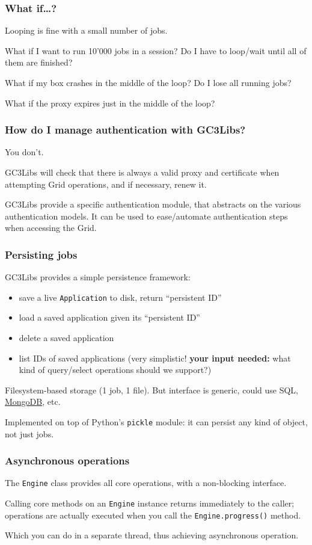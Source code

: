 \documentclass[presentation]{beamer}
\begin{document}
\begin{frame}
\frametitle{What if\ldots{}?}
\label{sec-16}

  Looping is fine with a small number of jobs.

  What if I want to run 10'000 jobs in a session? Do I have to
  loop/wait until all of them are finished?

  What if my box crashes in the middle of the loop?  Do I lose all
  running jobs? 

  What if the proxy expires just in the middle of the loop?
\end{frame}
\begin{frame}
\frametitle{How do I manage authentication with GC3Libs?}
\label{sec-17}

  You don't.

  GC3Libs will check that there is always a valid proxy and
  certificate when attempting Grid operations, and if necessary, renew
  it.  

  GC3Libs provide a specific authentication module, that abstracts on
  the various authentication models.  It can be used to ease/automate
  authentication steps when accessing the Grid.
\end{frame}
\begin{frame}
\frametitle{Persisting jobs}
\label{sec-18}

  GC3Libs provides a simple persistence framework: 
\begin{itemize}
\item save a live \texttt{Application} to disk, return ``persistent ID''
\item load a saved application given its ``persistent ID''
\item delete a saved application
\item list IDs of saved applications (very simplistic! \textbf{your input     needed:} what kind of query/select operations should we support?)
\end{itemize}

  Filesystem-based storage (1 job, 1 file).  But interface is generic,
  could use SQL, \href{http://www.mongodb.org}{MongoDB}, etc.

  Implemented on top of Python's \texttt{pickle} module: it can persist any
  kind of object, not just jobs.
\end{frame}
\begin{frame}
\frametitle{Asynchronous operations}
\label{sec-19}

  The \texttt{Engine} class provides all core operations, 
  with a non-blocking interface.

  Calling core methods on an \texttt{Engine} instance returns immediately to
  the caller; operations are actually executed when you call the
  \texttt{Engine.progress()} method.

  Which you can do in a separate thread, thus achieving
  asynchronous operation.
\end{frame}
\end{document}
